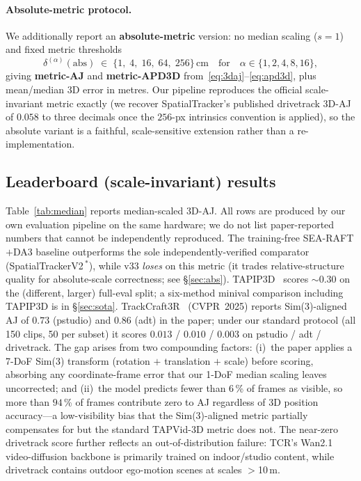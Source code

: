 \documentclass[11pt,a4paper]{article}
\begin{document}
\paragraph{Absolute-metric protocol.}
We additionally report an \textbf{absolute-metric} version: no median scaling ($s=1$) and
fixed metric thresholds
\begin{equation}
  \delta^{(\alpha)}(\text{abs})
  \;\in\;
  \{1,\;4,\;16,\;64,\;256\}\,\text{cm}
  \quad\text{for}\quad
  \alpha\in\{1,2,4,8,16\},
  \label{eq:thresh_abs}
\end{equation}
giving \textbf{metric-AJ} and \textbf{metric-APD3D} from~\eqref{eq:3daj}--\eqref{eq:apd3d},
plus mean/median 3D error in metres.
Our pipeline reproduces the official scale-invariant metric exactly
(we recover SpatialTracker's published drivetrack 3D-AJ of $0.058$ to three decimals
once the $256$-px intrinsics convention is applied), so the absolute variant is a
faithful, scale-sensitive extension rather than a re-implementation.

\subsection{Leaderboard (scale-invariant) results}
Table~\ref{tab:median} reports median-scaled 3D-AJ.
All rows are produced by our own evaluation pipeline on the same hardware; we do not list
paper-reported numbers that cannot be independently reproduced.
The training-free SEA-RAFT$+$DA3 baseline outperforms the sole independently-verified comparator
(SpatialTrackerV2\,$^{*}$), while v33 \emph{loses} on this metric (it
trades relative-structure quality for absolute-scale correctness; see \S\ref{sec:abs}).
TAPIP3D~\cite{tapip3d} scores $\sim$0.30 on the (different, larger) full-eval split;
a six-method minival comparison including TAPIP3D is in \S\ref{sec:sota}.
TrackCraft3R~\cite{trackcraft3r} (CVPR~2025) reports Sim(3)-aligned AJ of $0.73$ (pstudio) and
$0.86$ (adt) in the paper; under our standard protocol (all 150 clips, 50 per subset) it scores
$0.013$ / $0.010$ / $0.003$ on pstudio / adt / drivetrack.
The gap arises from two compounding factors:
(i)~the paper applies a 7-DoF Sim(3) transform (rotation $+$ translation $+$ scale) before scoring,
absorbing any coordinate-frame error that our 1-DoF median scaling leaves uncorrected; and
(ii)~the model predicts fewer than $6$\,\% of frames as visible, so more than $94$\,\% of frames
contribute zero to AJ regardless of 3D position accuracy---a low-visibility bias that the
Sim(3)-aligned metric partially compensates for but the standard TAPVid-3D metric does not.
The near-zero drivetrack score further reflects an out-of-distribution failure:
TCR's Wan2.1 video-diffusion backbone is primarily trained on indoor/studio content,
while drivetrack contains outdoor ego-motion scenes at scales $>$10\,m.
\end{document}
